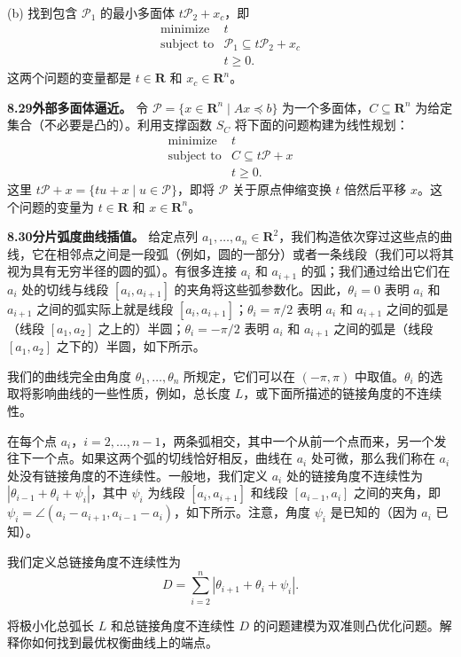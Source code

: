 \documentclass[UTF8, 12pt, fontset=fandol, oneside]{ctexart}
\begin{document}
(b) 找到包含 $\mathcal P_1$ 的最小多面体 $t\mathcal P_2+x_c$，即
\[
\begin{array}{ll}
\mbox{minimize} & t\\
\mbox{subject to} & \mathcal P_1\subseteq t\mathcal P_2+x_c\\
& t\geq 0.
\end{array}
\]
这两个问题的变量都是 $t\in\mathbf{R}$ 和 $x_c\in\mathbf{R}^n$。

\noindent\textbf{8.29\quad 外部多面体逼近。}
令 $\mathcal P=\{x\in\mathbf{R}^n\mid Ax\preceq b\}$ 为一个多面体，$C\subseteq\mathbf{R}^n$ 为给定集合（不必要是凸的）。利用支撑函数 $S_C$ 将下面的问题构建为线性规划：
\[
\begin{array}{ll}
\mbox{minimize} & t\\
\mbox{subject to} & C\subseteq t\mathcal P+x\\
& t\geq 0.
\end{array}
\]
这里 $t\mathcal P+x=\{tu+x\mid u\in\mathcal P\}$，即将 $\mathcal P$ 关于原点伸缩变换 $t$ 倍然后平移 $x$。这个问题的变量为 $t\in\mathbf{R}$ 和 $x\in\mathbf{R}^n$。

\noindent\textbf{8.30\quad 分片弧度曲线插值。}
给定点列 $a_1,\ldots,a_n\in\mathbf{R}^2$，我们构造依次穿过这些点的曲线，它在相邻点之间是一段弧（例如，圆的一部分）或者一条线段（我们可以将其视为具有无穷半径的圆的弧）。有很多连接 $a_i$ 和 $a_{i+1}$ 的弧；我们通过给出它们在 $a_i$ 处的切线与线段 $[a_i,a_{i+1}]$ 的夹角将这些弧参数化。因此，$\theta_i=0$ 表明 $a_i$ 和 $a_{i+1}$ 之间的弧实际上就是线段 $[a_i,a_{i+1}]$；$\theta_i=\pi/2$ 表明 $a_i$ 和 $a_{i+1}$ 之间的弧是（线段 $[a_1,a_2]$ 之上的）半圆；$\theta_i=-\pi/2$ 表明 $a_i$ 和 $a_{i+1}$ 之间的弧是（线段 $[a_1,a_2]$ 之下的）半圆，如下所示。

我们的曲线完全由角度 $\theta_1,\ldots,\theta_n$ 所规定，它们可以在 $(-\pi,\pi)$ 中取值。$\theta_i$ 的选取将影响曲线的一些性质，例如，总长度 $L$，或下面所描述的链接角度的不连续性。

在每个点 $a_i$，$i=2,\ldots,n-1$，两条弧相交，其中一个从前一个点而来，另一个发往下一个点。如果这两个弧的切线恰好相反，曲线在 $a_i$ 处可微，那么我们称在 $a_i$ 处没有链接角度的不连续性。一般地，我们定义 $a_i$ 处的链接角度不连续性为 $|\theta_{i-1}+\theta_i+\psi_i|$，其中 $\psi_i$ 为线段 $[a_i,a_{i+1}]$ 和线段 $[a_{i-1},a_i]$ 之间的夹角，即 $\psi_i=\angle(a_i-a_{i+1},a_{i-1}-a_i)$，如下所示。注意，角度 $\psi_i$ 是已知的（因为 $a_i$ 已知）。

我们定义总链接角度不连续性为
\[
D=\sum_{i=2}^n|\theta_{i+1}+\theta_i+\psi_i|.
\]

将极小化总弧长 $L$ 和总链接角度不连续性 $D$ 的问题建模为双准则凸优化问题。解释你如何找到最优权衡曲线上的端点。
\end{document}
